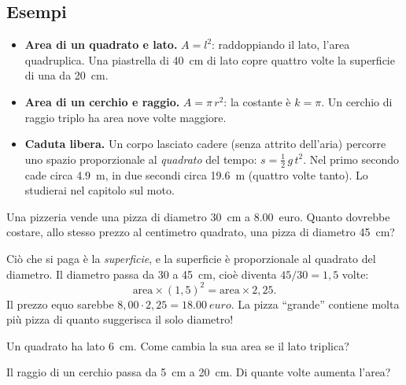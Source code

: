 \subsection{Esempi}
\begin{itemize}
    \item \textbf{Area di un quadrato e lato.} $A = l^2$: raddoppiando il lato, l'area quadruplica. Una piastrella di \SI{40}{\centi\metre} di lato copre quattro volte la superficie di una da \SI{20}{\centi\metre}.
    \item \textbf{Area di un cerchio e raggio.} $A = \pi\,r^2$: la costante è $k = \pi$. Un cerchio di raggio triplo ha area nove volte maggiore.
    \item \textbf{Caduta libera.} Un corpo lasciato cadere (senza attrito dell'aria) percorre uno spazio proporzionale al \emph{quadrato} del tempo: $s = \tfrac{1}{2}\,g\,t^2$. Nel primo secondo cade circa \SI{4,9}{\metre}, in due secondi circa \SI{19,6}{\metre} (quattro volte tanto). Lo studierai nel capitolo sul moto.
\end{itemize}

\begin{testexample}
Una pizzeria vende una pizza di diametro \SI{30}{\centi\metre} a \SI{8,00}{euro}. Quanto dovrebbe costare, allo stesso prezzo al centimetro quadrato, una pizza di diametro \SI{45}{\centi\metre}?

Ciò che si paga è la \emph{superficie}, e la superficie è proporzionale al quadrato del diametro. Il diametro passa da \SI{30}{} a \SI{45}{\centi\metre}, cioè diventa $45/30 = 1{,}5$ volte:
\[ \text{area} \times (1{,}5)^2 = \text{area} \times 2{,}25. \]
Il prezzo equo sarebbe $8{,}00 \cdot 2{,}25 = \SI{18,00}{euro}$. La pizza ``grande'' contiene molta più pizza di quanto suggerisca il solo diametro!
\end{testexample}

\begin{esercizio}
Un quadrato ha lato \SI{6}{\centi\metre}. Come cambia la sua area se il lato triplica?\\
\end{esercizio}

\begin{esercizio}
Il raggio di un cerchio passa da \SI{5}{\centi\metre} a \SI{20}{\centi\metre}. Di quante volte aumenta l'area?\\
\end{esercizio}

